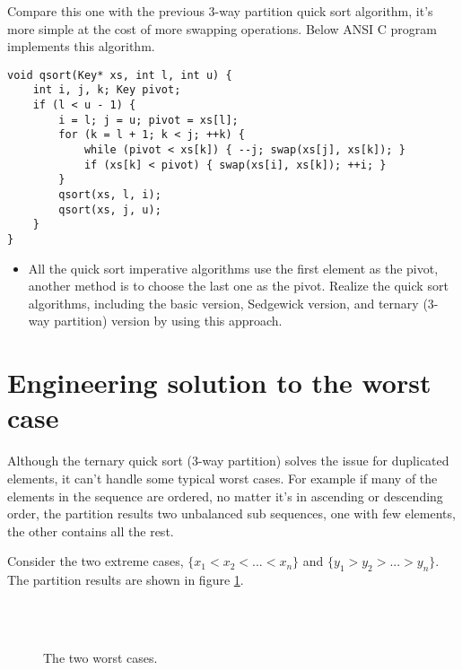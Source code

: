 \documentclass{article}
\begin{document}
Compare this one with the previous 3-way partition quick sort algorithm, it's more
simple at the cost of more swapping operations. Below ANSI C program implements this
algorithm.

\lstset{language=C}
\begin{lstlisting}
void qsort(Key* xs, int l, int u) {
    int i, j, k; Key pivot;
    if (l < u - 1) {
        i = l; j = u; pivot = xs[l];
        for (k = l + 1; k < j; ++k) {
            while (pivot < xs[k]) { --j; swap(xs[j], xs[k]); }
            if (xs[k] < pivot) { swap(xs[i], xs[k]); ++i; }
        }
        qsort(xs, l, i);
        qsort(xs, j, u);
    }
}
\end{lstlisting}

\begin{Exercise}
\begin{itemize}
\item All the quick sort imperative algorithms use the first element as the pivot, another method is to choose the
last one as the pivot. Realize the quick sort algorithms, including the basic version, Sedgewick version, and
ternary (3-way partition) version by using this approach.
\end{itemize}
\end{Exercise}

\section{Engineering solution to the worst case}
Although the ternary quick sort (3-way partition) solves the issue for duplicated elements, it can't handle 
some typical worst cases. For example if many of the elements in the sequence are ordered, no matter it's 
in ascending or descending order, the partition results two unbalanced sub sequences, one with few elements,
the other contains all the rest.

Consider the two extreme cases, $\{ x_1 < x_2 < ... < x_n\}$ and $\{ y_1 > y_2 > ... > y_n\}$. The partition 
results are shown in figure \ref{fig:worst-cases-1}.

\begin{figure}[htbp]
   \centering
    \\
    \\
   \caption{The two worst cases.} 
   \label{fig:worst-cases-1}
\end{figure}
\end{document}
